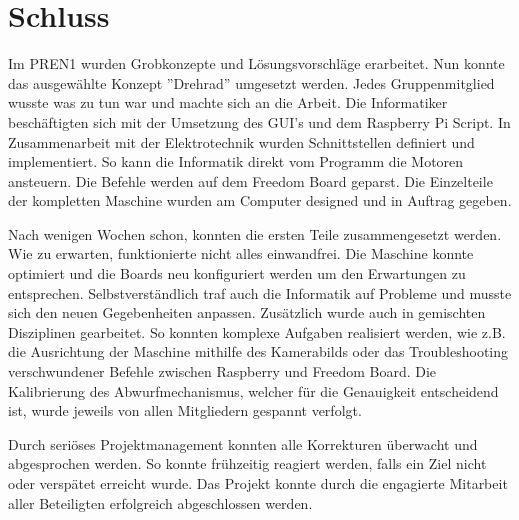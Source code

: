 \section{Schluss}

Im PREN1 wurden Grobkonzepte und Lösungsvorschläge erarbeitet. Nun konnte das ausgewählte Konzept ''Drehrad'' umgesetzt werden. Jedes Gruppenmitglied wusste was zu tun war und machte sich an die Arbeit.
Die Informatiker beschäftigten sich mit der Umsetzung des GUI's und dem Raspberry Pi Script.
In Zusammenarbeit mit der Elektrotechnik wurden Schnittstellen definiert und implementiert.
So kann die Informatik direkt vom Programm die Motoren ansteuern. Die Befehle werden auf dem Freedom Board geparst.
Die Einzelteile der kompletten Maschine wurden am Computer designed und in Auftrag gegeben.

Nach wenigen Wochen schon, konnten die ersten Teile zusammengesetzt werden. Wie zu erwarten, funktionierte nicht alles einwandfrei. Die Maschine konnte optimiert und die Boards neu konfiguriert werden um den Erwartungen zu entsprechen.
Selbstverständlich traf auch die Informatik auf Probleme und musste sich den neuen Gegebenheiten anpassen.
Zusätzlich wurde auch in gemischten Disziplinen gearbeitet. So konnten komplexe Aufgaben realisiert werden, wie z.B. die Ausrichtung der Maschine mithilfe des Kamerabilds oder das Troubleshooting verschwundener Befehle zwischen Raspberry und Freedom Board. Die Kalibrierung des Abwurfmechanismus, welcher für die Genauigkeit entscheidend ist, wurde jeweils von allen Mitgliedern gespannt verfolgt.

Durch seriöses Projektmanagement konnten alle Korrekturen überwacht und abgesprochen werden.
So konnte frühzeitig reagiert werden, falls ein Ziel nicht oder verspätet erreicht wurde.
Das Projekt konnte durch die engagierte Mitarbeit aller Beteiligten erfolgreich abgeschlossen werden.
